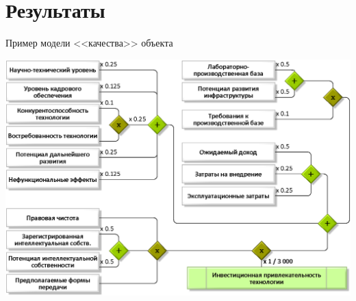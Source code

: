  
\section{Результаты}

\begin{frame}{Пример модели <<качества>> объекта}
	\begin{center}
		\includegraphics[width=0.85\linewidth]{./pic/schemeF2}
	\end{center}
\end{frame} %

